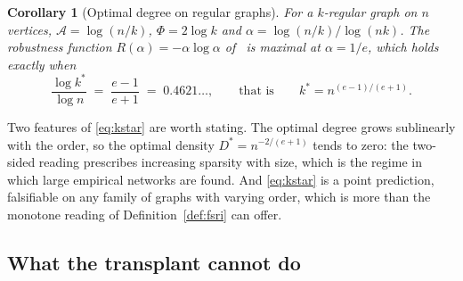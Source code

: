 \documentclass[11pt,a4paper]{article}
\newtheorem{corollary}{Corollary}
\begin{document}
\begin{corollary}[Optimal degree on regular graphs]
\label{cor:kstar}
For a $k$-regular graph on $n$ vertices, $\mathcal{A} = \log(n/k)$,
$\Phi = 2\log k$ and $\alpha = \log(n/k)/\log(nk)$. The robustness function
$R(\alpha) = -\alpha\log\alpha$ of~\cite{ulanowicz2009} is maximal at
$\alpha = 1/e$, which holds exactly when
\begin{equation}
\frac{\log k^\ast}{\log n} \;=\; \frac{e-1}{e+1} \;=\; 0.4621\ldots,
\qquad\text{that is}\qquad k^\ast = n^{(e-1)/(e+1)} .
\label{eq:kstar}
\end{equation}
\end{corollary}

Two features of \eqref{eq:kstar} are worth stating. The optimal degree grows
sublinearly with the order, so the optimal density $D^\ast = n^{-2/(e+1)}$
tends to zero: the two-sided reading prescribes increasing sparsity with size,
which is the regime in which large empirical networks are found. And
\eqref{eq:kstar} is a point prediction, falsifiable on any family of graphs
with varying order, which is more than the monotone reading of
Definition~\ref{def:fsri} can offer.

\subsection{What the transplant cannot do}
\end{document}
